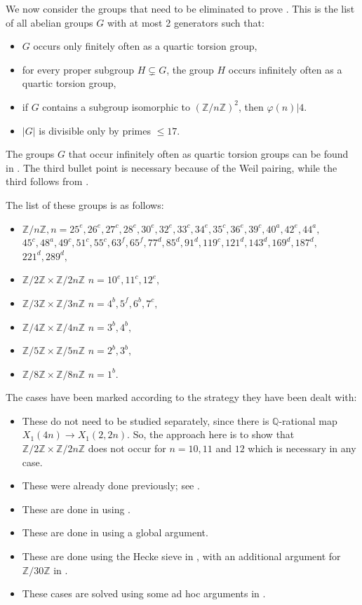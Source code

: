 \documentclass[11pt,reqno]{amsart}
\theoremstyle{definition}
\numberwithin{equation}{section}
\newcommand{\Q}{\mathbb{Q}}
\newcommand{\Z}{\mathbb{Z}}
\def\torz#1{\mathbb Z /#1 \mathbb Z}
\def\tg#1#2{\mathbb Z/#1\mathbb Z \times \mathbb Z /#2 \mathbb Z}
\begin{document}
We now consider the groups that need to be eliminated to prove . This is the list of all abelian groups $G$ with at most 2 generators such that:
\begin{itemize}
    \item $G$ occurs only finitely often as a quartic torsion group,
    \item for every proper subgroup $H \subsetneq G$, the group $H$ occurs infinitely often as a quartic torsion group,
    \item if $G$ contains a subgroup isomorphic to $(\Z/n\Z)^2$, then $\varphi(n)|4.$
    \item $|G|$ is divisible only by primes $\leq 17.$
\end{itemize}
The groups $G$ that occur infinitely often as quartic torsion groups can be found in . The third bullet point is necessary because of the Weil pairing, while the third follows from \cite[Theorem 1.2.]{DKSS}.

The list of these groups is as follows:
\begin{itemize}
\item $\Z/n\Z, n =  {25^e, 26^e, 27^c, 28^e, 30^e, 32^e, 33^c, 34^e, 35^c, 36^e, 39^c, 40^a, 42^e, 44^a,}$  ${45^c, 48^a, 49^c, 51^c, 55^c, 63^f, 65^f, 77^d, 85^d, 91^d, 119^c, 121^d, 143^d, 169^d, 187^d,}$
${221^d, 289^d, }$

\item $\tg{2}{2n}$ $n=10^e,11^c,12^e,$
\item $\tg{3}{3n}$ $n=4^b,5^f,6^b,7^c,$
\item $\tg{4}{4n}$ $n=3^b,4^b,$
\item $\tg{5}{5n}$ $n=2^b,3^b,$
\item $\tg{8}{8n}$ $n=1^b.$
\end{itemize}

The cases have been marked according to the strategy they have been dealt with:
\begin{itemize}
    \item[$a$] These do not need to be studied separately, since there is $\Q$-rational map $X_1(4n) \to X_1(2,2n)$. So, the approach here is to show that $\tg{2}{2n}$ does not occur for $n=10,11$ and $12$ which is necessary in any case.
     
    \item[$b$] These were already done previously; see .
    \item[$c$] These are done in  using .

    \item[$d$] These are done in  using a global argument.
    \item[$e$] These are done using the Hecke sieve in , with an additional argument for $\torz{30}$ in .
    \item[$f$] These cases are solved using some ad hoc arguments in .
\end{itemize}
\end{document}
